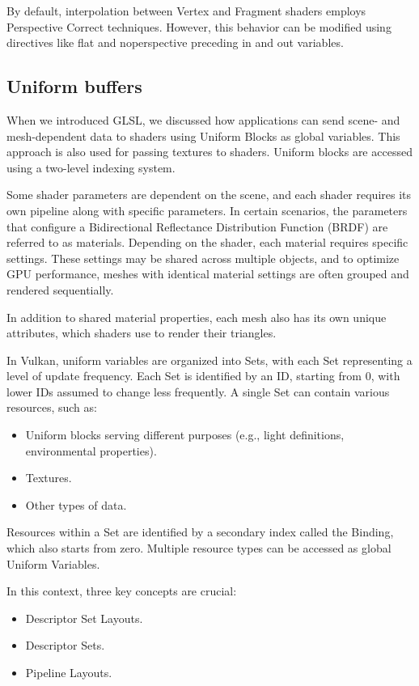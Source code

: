 By default, interpolation between Vertex and Fragment shaders employs Perspective Correct techniques.
However, this behavior can be modified using directives like flat and noperspective preceding in and out variables.

\subsection{Uniform buffers}
When we introduced GLSL, we discussed how applications can send scene- and mesh-dependent data to shaders using Uniform Blocks as global variables. 
This approach is also used for passing textures to shaders. Uniform blocks are accessed using a two-level indexing system.

Some shader parameters are dependent on the scene, and each shader requires its own pipeline along with specific parameters. 
In certain scenarios, the parameters that configure a Bidirectional Reflectance Distribution Function (BRDF) are referred to as materials. 
Depending on the shader, each material requires specific settings. 
These settings may be shared across multiple objects, and to optimize GPU performance, meshes with identical material settings are often grouped and rendered sequentially.

In addition to shared material properties, each mesh also has its own unique attributes, which shaders use to render their triangles.

In Vulkan, uniform variables are organized into Sets, with each Set representing a level of update frequency. 
Each Set is identified by an ID, starting from 0, with lower IDs assumed to change less frequently. 
A single Set can contain various resources, such as:
\begin{itemize}
    \item Uniform blocks serving different purposes (e.g., light definitions, environmental properties).
    \item Textures.
    \item Other types of data.
\end{itemize}
Resources within a Set are identified by a secondary index called the Binding, which also starts from zero. Multiple resource types can be accessed as global Uniform Variables.

In this context, three key concepts are crucial:
\begin{itemize}
    \item Descriptor Set Layouts.
    \item Descriptor Sets.
    \item Pipeline Layouts.
\end{itemize}

